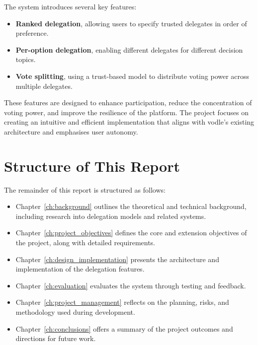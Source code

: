 The system introduces several key features:
\begin{itemize}
  \item \textbf{Ranked delegation}, allowing users to specify trusted delegates in order of preference.
  \item \textbf{Per-option delegation}, enabling different delegates for different decision topics.
  \item \textbf{Vote splitting}, using a trust-based model to distribute voting power across multiple delegates.
\end{itemize}

These features are designed to enhance participation, reduce the concentration of voting power, and improve the resilience of the platform. The project focuses on creating an intuitive and efficient implementation that aligns with vodle's existing architecture and emphasises user autonomy.

\section{Structure of This Report}

The remainder of this report is structured as follows:

\begin{itemize}
  \item Chapter~\ref{ch:background} outlines the theoretical and technical background, including research into delegation models and related systems.
  \item Chapter~\ref{ch:project_objectives} defines the core and extension objectives of the project, along with detailed requirements.
  \item Chapter~\ref{ch:design_implementation} presents the architecture and implementation of the delegation features.
  \item Chapter~\ref{ch:evaluation} evaluates the system through testing and feedback.
  \item Chapter~\ref{ch:project_management} reflects on the planning, risks, and methodology used during development.
  \item Chapter~\ref{ch:conclusions} offers a summary of the project outcomes and directions for future work.
\end{itemize}